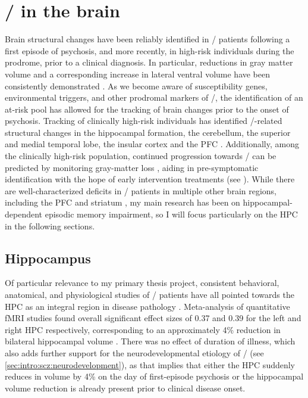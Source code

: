 \section{\Scz/ in the brain}
\label{sec:intro:scz:brain}
Brain structural changes have been reliably identified in \scz/ patients following a first episode of psychosis, and more recently, in high-risk individuals during the prodrome, prior to a clinical diagnosis.
In particular, reductions in gray matter volume and a corresponding increase in lateral ventral volume have been consistently demonstrated \citep{Fusar-Poli2013, Shepherd2012}.
As we become aware of susceptibility genes, environmental triggers, and other prodromal markers of \scz/, the identification of an at-risk pool has allowed for the tracking of brain changes prior to the onset of psychosis.
Tracking of clinically high-risk individuals has identified \scz/-related structural changes in the hippocampal formation, the cerebellum, the superior and medial temporal lobe, the insular cortex and the \ac{PFC} \citep{Cannon2015, Millan2016}.
Additionally, among the clinically high-risk population, continued progression towards \scz/ can be predicted by monitoring gray-matter loss \citep{Tognin2014}, aiding in pre-symptomatic identification with the hope of early intervention treatments (see ).
While there are well-characterized deficits in \scz/ patients in multiple other brain regions, including the \ac{PFC} \citep{Weinberger1986} and striatum \citep{Simpson2010}, my main research has been on hippocampal-dependent episodic memory impairment, so I will focus particularly on the \ac{HPC} in the following sections.

\subsection{Hippocampus}
\label{sec:intro:scz:hpc}
Of particular relevance to my primary thesis project, consistent behavioral, anatomical, and physiological studies of \scz/ patients have all pointed towards the HPC as an integral region in disease pathology \citep{Boyer2007, Bogerts1985, Jakob1986}.
Meta-analysis of quantitative \ac{fMRI} studies found overall significant effect sizes of 0.37 and 0.39 for the left and right \ac{HPC} respectively, corresponding to an approximately 4\% reduction in bilateral hippocampal volume \citep{Nelson1998}.
There was no effect of duration of illness, which also adds further support for the neurodevelopmental etiology of \scz/ (see \autoref{sec:intro:scz:neurodevelopment}), as that implies that either the \ac{HPC} suddenly reduces in volume by 4\% on the day of first-episode psychosis or the hippocampal volume reduction is already present prior to clinical disease onset. 

